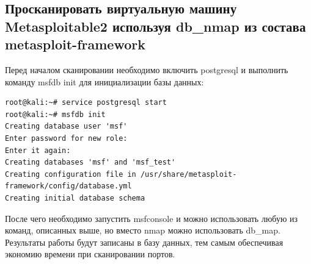 \documentclass[10pt,a4paper]{report}
\begin{document}
		\subsection{Просканировать виртуальную машину Metasploitable2 используя db\_nmap из состава metasploit-framework}
		Перед началом сканировании необходимо включить postgresql и выполнить команду msfdb init для инициализации базы данных:
		\begin{verbatim}
root@kali:~# service postgresql start
root@kali:~# msfdb init
Creating database user 'msf'
Enter password for new role: 
Enter it again: 
Creating databases 'msf' and 'msf_test'
Creating configuration file in /usr/share/metasploit-framework/config/database.yml
Creating initial database schema
		\end{verbatim}
		После чего необходимо запустить msfconsole и можно использовать любую из команд, описанных выше, но вместо nmap можно использовать db\_map. Результаты работы будут записаны в базу данных, тем самым обеспечивая экономию времени при сканировании портов.
\end{document}
